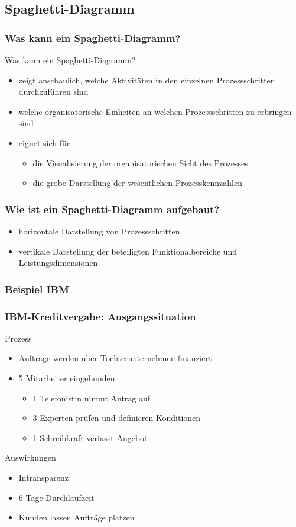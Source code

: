 \documentclass{beamer}
\begin{document}
 \subsection[Spaghetti-Diagramm]{Spaghetti-Diagramm}
 \begin{frame}
  \frametitle{Was kann ein Spaghetti-Diagramm?  }
  
Was kann ein Spaghetti-Diagramm?  
  \begin{itemize}
  \item zeigt anschaulich, welche Aktivitäten in den einzelnen Prozessschritten durchzuführen sind
  \item welche organisatorische Einheiten an welchen Prozessschritten zu erbringen sind
  \item eignet sich für 
  \begin{itemize}
  	\item die Visualisierung der organisatorischen Sicht des Prozesses
  	\item die grobe Darstellung der wesentlichen Prozesskennzahlen 
  \end{itemize}
  \end{itemize}
  
   \end{frame}

\begin{frame}
  \frametitle{Wie ist ein Spaghetti-Diagramm aufgebaut?}
  
  \begin{itemize}
  \item horizontale Darstellung von Prozessschritten
  \item vertikale Darstellung der beteiligten Funktionalbereiche und Leistungsdimensionen
  \end{itemize}

 \end{frame}


 \subsubsection[Beispiel IBM]{Beispiel IBM}
 \begin{frame}
  \frametitle{IBM-Kreditvergabe: Ausgangssituation}
  Prozess
  \begin{itemize}
    \item Aufträge werden über Tochterunternehmen finanziert
    \item 5 Mitarbeiter eingebunden:
    \begin{itemize}
      \item 1 Telefonistin nimmt Antrag auf
      \item 3 Experten prüfen und definieren Konditionen
      \item 1 Schreibkraft verfasst Angebot
    \end{itemize}
  \end{itemize}
  Auswirkungen
  \begin{itemize}
    \item Intransparenz
    \item 6 Tage Durchlaufzeit
    \item Kunden lassen Aufträge platzen
  \end{itemize}
 \end{frame}
\end{document}
